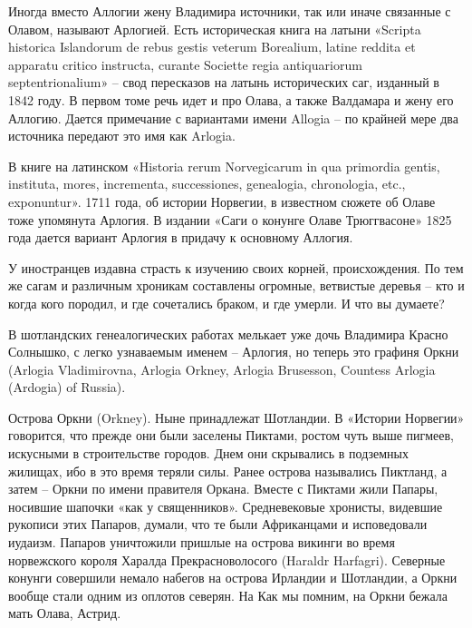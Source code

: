 


Иногда вместо Аллогии жену Владимира источники, так или иначе связанные с Олавом, называют Арлогией. Есть историческая книга на латыни «Scripta historica Islandorum de rebus gestis veterum Borealium, latine reddita et apparatu critico instructa, curante Societ\-te regia antiquariorum septentrionalium» – свод пересказов на латынь исторических саг, изданный в 1842 году. В первом томе речь идет и про Олава, а также Валдамара и жену его Аллогию. Дается примечание с вариантами имени Allogia – по крайней мере два источника передают это имя как Arlogia.

В книге на латинском «Historia rerum Norvegicarum in qua primordia gentis, instituta, mores, incrementa, successi\-ones, genealogia, chronologia, etc., exponuntur». 1711 года, об истории Норвегии, в известном сюжете об Олаве тоже упомянута Арлогия. В издании «Саги о конунге Олаве Трюггвасоне» 1825 года дается вариант Арлогия в придачу к основному Аллогия.

У иностранцев издавна страсть к изучению своих корней, происхождения. По тем же сагам и различным хроникам составлены огромные, ветвистые деревья – кто и когда кого породил, и где сочетались браком, и где умерли. И что вы думаете?

В шотландских генеалогических работах мелькает уже дочь Владимира Красно Солнышко, с легко узнаваемым именем – Арлогия, но теперь это графиня Оркни (Arlogia Vladimirovna, Arlogia Orkney, Arlogia Brusesson, Countess Arlogia (Ardogia) of Russia).

Острова Оркни (Orkney). Ныне принадлежат Шотландии. В «Истории Норвегии» говорится, что прежде они были заселены Пиктами, ростом чуть выше пигмеев, искусными в строительстве городов. Днем они скрывались в подземных жилищах, ибо в это время теряли силы. Ранее острова назывались Пиктланд, а затем – Оркни по имени правителя Оркана. Вместе с Пиктами жили Папары, носившие шапочки «как у священников». Средневековые хронисты, видевшие рукописи этих Папаров, думали, что те были Африканцами и исповедовали иудаизм. Папаров уничтожили пришлые на острова викинги во время норвежского короля Харалда Прекрасноволосого (Haraldr Harfagri). Северные конунги совершили немало набегов на острова Ирландии и Шотландии, а Оркни вообще стали одним из оплотов северян. На Как мы помним, на Оркни бежала мать Олава, Астрид.

